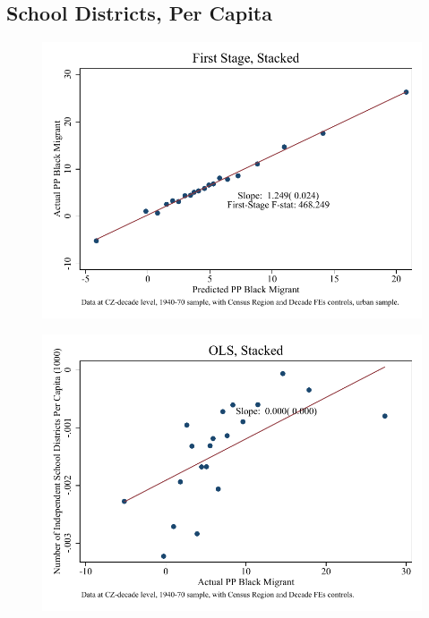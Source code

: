 \documentclass{article}
\begin{document}
\subsection{School Districts, Per Capita}

\clearpage
\begin{figure}
\centering
\includegraphics{figures/simplefigs/stacked_schdist_ind_pc_C3_urban_fs.pdf}
\end{figure}
\clearpage
\begin{figure}
\centering
\includegraphics{figures/simplefigs/stacked_schdist_ind_pc_C3_urban_ols.pdf}
\end{figure}
\clearpage
\end{document}
